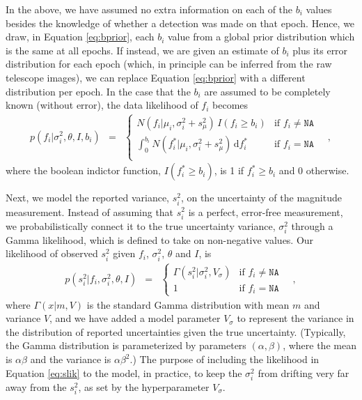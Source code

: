 \documentclass[12pt,preprint]{aastex}
\newcommand{\dd}{\mathrm{d}}
\newcommand{\fobs}{f_i}
\newcommand{\sobs}{s^2_i}
\newcommand{\ftrue}{f_i^*}
\begin{document}
In the above, we have assumed no extra information on each of the $b_i$ values besides the knowledge of whether a detection was made on that epoch.  Hence, we draw, in Equation \ref{eq:bprior}, each $b_i$ value from a global prior distribution which is the same at all epochs.  If instead, we are given an estimate of $b_i$ plus its error distribution for each epoch (which, in principle can be inferred from the raw telescope images), we can replace Equation \ref{eq:bprior} with a different distribution per epoch.  In the case that the $b_i$ are assumed to be completely known (without error), the data likelihood of $\fobs$ becomes
\begin{eqnarray}\displaystyle
p(\fobs |\sigma^2_i,\theta,I, b_i) &=& \left\{\begin{array}{ll}
  N(\fobs | \mu_i,  \sigma^2_i + s^2_{\mu})\,  I(\fobs \ge b_i) & \mbox{if $\fobs \ne \texttt{NA}$} \\
 \int_{0}^{b_i} N(\ftrue | \mu_i, \sigma^2_i + s^2_{\mu})\, \dd \ftrue & \mbox{if $\fobs = \texttt{NA}$} \\
\end{array}\right.\label{eq:mlik_s}
\quad ,
\end{eqnarray}
where the boolean indictor function, $I(\ftrue \ge b_i)$, is 1 if $\ftrue \ge b_i$ and 0 otherwise.

Next, we model the reported variance, $\sobs$, on the uncertainty of the magnitude measurement.  Instead of assuming that $\sobs$ is a perfect, error-free measurement, we probabilistically connect it to the true uncertainty variance, $\sigma^2_i$ through a Gamma likelihood, which is defined to take on non-negative values.  Our likelihood of observed $\sobs$ given $\fobs$, $\sigma^2_i$, $\theta$ and $I$, is
\begin{eqnarray}\displaystyle
p(\sobs | \fobs, \sigma^2_i, \theta,I) &=& \left\{\begin{array}{ll}
  \Gamma (\sobs | \sigma^2_i, V_{\sigma} ) & \mbox{if $\fobs \ne \texttt{NA}$} \\
 1& \mbox{if $\fobs = \texttt{NA}$}
\end{array}\right.\label{eq:slik}
\quad ,
\end{eqnarray}
where $\Gamma(x | m, V)$ is the standard Gamma distribution with mean $m$ and variance $V$, 
and we have added a model parameter $V_\sigma$ to represent the
variance in the distribution of reported uncertainties given the true
uncertainty.  (Typically, the Gamma distribution is parameterized by parameters $(\alpha, \beta)$, where the mean is $\alpha\beta$ and the variance is $\alpha\beta^2$.)  The  purpose of 
 including the likelihood in Equation \ref{eq:slik} to the model, in practice, to keep the $\sigma^2_i$ from
drifting very far away from the $\sobs$, as set by the hyperparameter
$V_\sigma$.
\end{document}

